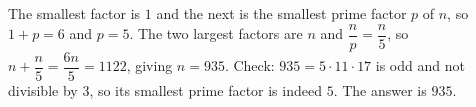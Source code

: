 The smallest factor is $1$ and the next is the smallest prime factor $p$ of $n$, so $1+p=6$ and $p=5$. The two largest factors are $n$ and $\dfrac {n}{p}=\dfrac {n}{5}$, so $n+\dfrac {n}{5}=\dfrac{6n}{5}=1122$, giving $n=935$. Check: $935=5\cdot11\cdot17$ is odd and not divisible by $3$, so its smallest prime factor is indeed $5$. The answer is $\boxed{935}$.
